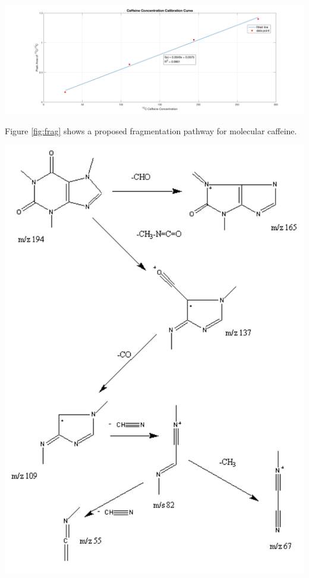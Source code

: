 \documentclass{article}
\begin{document}
\newpage
\begin{center}
    \includegraphics[scale=0.2]{calibration_curve}
\end{center}





 





Figure \ref{fig:frag} shows a proposed fragmentation pathway for molecular
caffeine.
\begin{center}
    \includegraphics[scale=0.7]{pathway}
    \label{fig:frag}
\end{center}
\newpage
\end{document}
